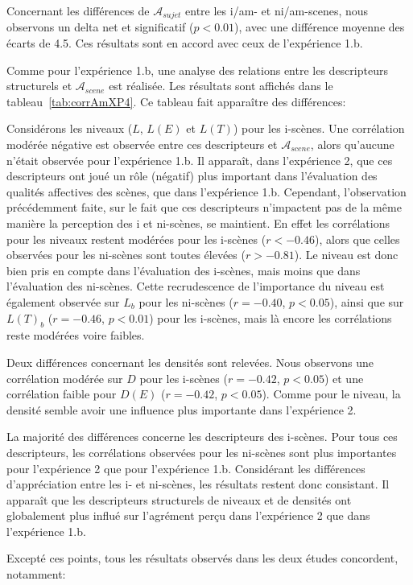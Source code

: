 Concernant les différences de $\mathcal{A}_{sujet}$ entre les i/am- et ni/am-scenes, nous observons un delta net et significatif ($p<0.01$), avec une différence moyenne des écarts de 4.5. Ces résultats sont en accord avec ceux de l'expérience 1.b.

Comme pour l'expérience 1.b, une analyse des relations entre les descripteurs structurels et $\mathcal{A}_{scene}$ est réalisée. Les résultats sont affichés dans le tableau~\ref{tab:corrAmXP4}. Ce tableau fait apparaître des différences: 

Considérons les niveaux ($L$, $L(E)$ et $L(T)$) pour les i-scènes. Une corrélation modérée négative est observée entre ces descripteurs et $\mathcal{A}_{scene}$, alors qu'aucune n'était observée pour l'expérience 1.b. Il apparaît, dans l'expérience 2, que ces descripteurs ont joué un rôle (négatif) plus important dans l'évaluation des qualités affectives des scènes, que dans l'expérience 1.b. Cependant, l'observation précédemment faite, sur le fait que ces descripteurs n'impactent pas de la même manière la perception des i et ni-scènes, se maintient. En effet les corrélations pour les niveaux restent modérées pour les i-scènes ($r<-0.46$), alors que celles observées pour les ni-scènes sont toutes élevées ($r>-0.81$). Le niveau est donc bien pris en compte dans l'évaluation des i-scènes, mais moins que dans l'évaluation des ni-scènes. Cette recrudescence de l'importance du niveau est également observée sur $L_b$ pour les ni-scènes ($r=-0.40$, $p<0.05$), ainsi que sur $L(T)_b$ ($r=-0.46$, $p<0.01$) pour les i-scènes, mais là encore les corrélations reste modérées voire faibles.

Deux différences concernant les densités sont relevées. Nous observons une corrélation modérée sur $D$ pour les i-scènes ($r=-0.42$, $p<0.05$) et une corrélation faible pour $D(E)$ ($r=-0.42$, $p<0.05$). Comme pour le niveau, la densité semble avoir une influence plus importante dans l'expérience 2. 

La majorité des différences concerne les descripteurs des i-scènes. Pour tous ces descripteurs, les corrélations observées pour les ni-scènes sont plus importantes pour l'expérience 2 que pour l'expérience 1.b. Considérant les différences d'appréciation entre les i- et ni-scènes, les résultats restent donc consistant. Il apparaît que les descripteurs structurels de niveaux et de densités ont globalement plus influé sur l'agrément perçu dans l'expérience 2 que dans l'expérience 1.b.

Excepté ces points, tous les résultats observés dans les deux études concordent, notamment:

